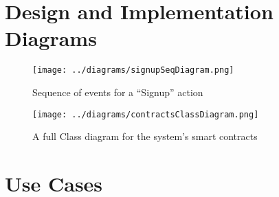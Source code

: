 \appendix
\chapter{Design and Implementation Diagrams}

\begin{figure}[htbp]
\centering
\texttt{[image: ../diagrams/signupSeqDiagram.png]}
\caption{Sequence of events for a ``Signup'' action}
\end{figure}

\begin{sidewaysfigure}[ht]
\centering
\texttt{[image: ../diagrams/contractsClassDiagram.png]}
\caption{A full Class diagram for the system's smart contracts}
\end{sidewaysfigure}

\chapter{Use Cases}


